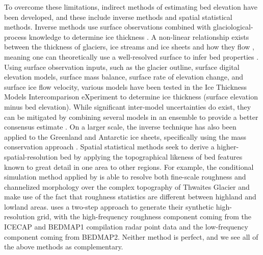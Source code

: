 \documentclass[tc, noline]{copernicus}
\begin{document}
To overcome these limitations, indirect methods of estimating bed elevation have been developed, and these include inverse methods and spatial
statistical methods. Inverse methods use surface observations combined with glaciological-process knowledge to determine ice thickness
\citep[e.g.][]{vanPeltiterativeinversemethod2013}. A non-linear relationship exists between the thickness of glaciers, ice streams and ice sheets and
how they flow \citep{Raymondrelationshipsurfacebasal2005}, meaning one can theoretically use a well-resolved surface to infer bed properties
\citep[e.g.][]{Farinottimethodestimateice2009}. Using surface observation inputs, such as the glacier outline, surface digital elevation models,
surface mass balance, surface rate of elevation change, and surface ice flow velocity, various models have been tested in the Ice Thickness Models
Intercomparison eXperiment \citep[ITMIX;][]{FarinottiHowaccurateare2017} to determine ice thickness (surface elevation minus bed elevation). While
significant inter-model uncertainties do exist, they can be mitigated by combining several models in an ensemble to provide a better consensus
estimate \citep{Farinotticonsensusestimateice2019}. On a larger scale, the inverse technique has also been applied to the Greenland
\citep{MorlighemBedMachinev3Complete2017} and Antarctic \citep{MorlighemDeepglacialtroughs2019} ice sheets, specifically using the mass conservation
approach \citep{Morlighemmassconservationapproach2011}. Spatial statistical methods seek to derive a higher-spatial-resolution bed by applying the
topographical likeness of bed features known to great detail in one area to other regions. For example, the conditional simulation method applied by
\citet{GoffConditionalsimulationThwaites2014} is able to resolve both fine-scale roughness and channelized morphology over the complex topography of
Thwaites Glacier and make use of the fact that roughness statistics are different between highland and lowland
areas. \citet{Grahamhighresolutionsyntheticbed2017} uses a two-step approach to generate their synthetic high-resolution grid, with the high-frequency roughness
component coming from the ICECAP and BEDMAP1 compilation radar point data and the low-frequency component coming from BEDMAP2. Neither method is
perfect, and we see all of the above methods as complementary.
\end{document}
